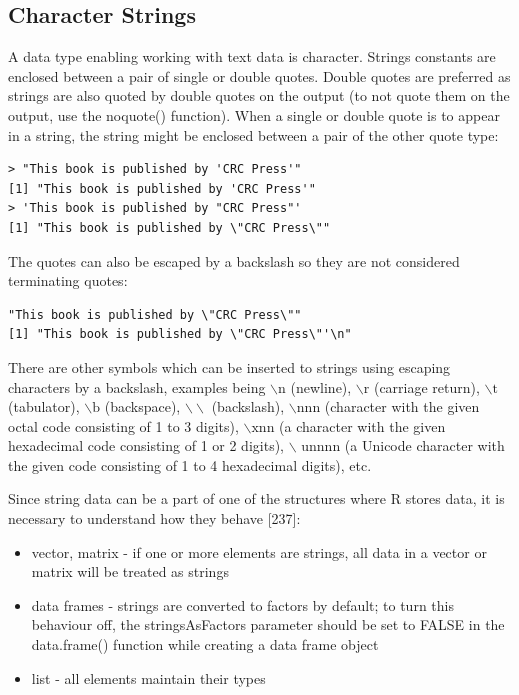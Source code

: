 \documentclass[11pt,openany,executivepaper]{book}
\begin{document}
\subsection{Character Strings}
A data type enabling working with text data is character. Strings constants are enclosed between a pair of single or double quotes. Double quotes are preferred as strings are also quoted by double quotes on the output (to not quote them on the output, use the noquote() function). When a single or double quote is to appear in a string, the string might be enclosed between a pair of the other quote type:

\begin{verbatim}
> "This book is published by 'CRC Press'"
[1] "This book is published by 'CRC Press'"
> 'This book is published by "CRC Press"'
[1] "This book is published by \"CRC Press\""
\end{verbatim}

The quotes can also be escaped by a backslash so they are not considered terminating quotes:

\begin{verbatim}
"This book is published by \"CRC Press\""
[1] "This book is published by \"CRC Press\"'\n"
\end{verbatim}

There are other symbols which can be inserted to strings using escaping characters by a backslash, examples being $\backslash \mathrm{n}$ (newline), $\backslash \mathrm{r}$ (carriage return), $\backslash \mathrm{t}$ (tabulator), $\backslash \mathrm{b}$ (backspace), $\backslash \backslash$ (backslash), $\backslash \mathrm{nnn}$ (character with the given octal code consisting of 1 to 3 digits), $\backslash \mathrm{xnn}$ (a character with the given hexadecimal code consisting of 1 or 2 digits), $\backslash$ unnnn (a Unicode character with the given code consisting of 1 to 4 hexadecimal digits), etc.

Since string data can be a part of one of the structures where R stores data, it is necessary to understand how they behave [237]:

\begin{itemize}
  \item vector, matrix - if one or more elements are strings, all data in a vector or matrix will be treated as strings
  \item data frames - strings are converted to factors by default; to turn this behaviour off, the stringsAsFactors parameter should be set to FALSE in the data.frame() function while creating a data frame object
  \item list - all elements maintain their types
\end{itemize}
\end{document}
